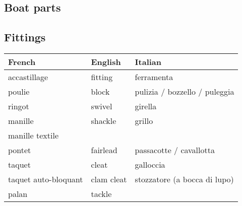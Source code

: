 \documentclass[a4paper, 12pt, twoside]{article}
\begin{document}
\begin{indt}{\section{Boat parts}}
        \begin{indt}{\subsection{Fittings}} %
            \begin{tabular}{|l|l|l|}
                \hline %
                \textbf{French}
                & \textbf{English}
                & \textbf{Italian}
                \\
                \hline
                \hline %
                accastillage %
                & fitting
                & ferramenta
                \\
                \hline %
                poulie %
                & block
                & pulizia / bozzello / puleggia
                \\
                \hline %
                ringot %
                & swivel
                & girella
                \\
                \hline %
                manille %
                & shackle
                & grillo
                \\
                \hline %
                manille textile %
                &
                &
                \\
                \hline %
                pontet %
                & fairlead
                & passacotte / cavallotta
                \\
                \hline %
                taquet %
                & cleat
                & galloccia
                \\
                \hline %
                taquet auto-bloquant %
                & clam cleat
                & stozzatore (a bocca di lupo)
                \\
                \hline %
                palan %
                & tackle
                &
                \\
                \hline %
            \end{tabular}
        \end{indt} %


\end{indt}
\end{document}
